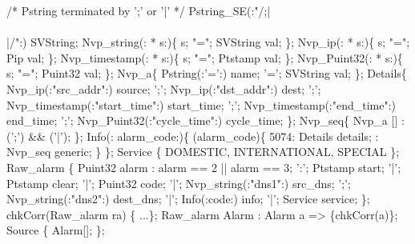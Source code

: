% 
\begin{code}
/* Pstring terminated by ';' or '|' */
 Pstring\_SE(:"/;|\\\\|/":) SVString;
\mbox{}
 Nvp\_string(: * s:)\{
  s; "="; SVString val;
\};
\mbox{}
 Nvp\_ip(: * s:)\{
  s; "="; Pip val;
\};
\mbox{}
 Nvp\_timestamp(: * s:)\{
  s; "="; Ptstamp val;
\};
\mbox{}
 Nvp\_Puint32(: * s:)\{
  s; "="; Puint32 val;
\};
\mbox{}
 Nvp\_a\{
      Pstring(:'=':) name;
 '='; SVString       val;
\};
\mbox{}
 Details\{
      Nvp\_ip(:"src\_addr":) source;
';';  Nvp\_ip(:"dst\_addr":) dest;
';';  Nvp\_timestamp(:"start\_time":) start\_time;
';';  Nvp\_timestamp(:"end\_time":)   end\_time;
';';  Nvp\_Puint32(:"cycle\_time":)   cycle\_time;
\};
\mbox{}
 Nvp\_seq\{
  Nvp\_a [] : (';') && ('|');
\};
\mbox{}
 Info(: alarm\_code:)\{
   (alarm\_code)\{
     5074: Details   details;
    :   Nvp\_seq   generic;
  \}
\};
\mbox{}
 Service \{
   DOMESTIC,
   INTERNATIONAL,
   SPECIAL
\};
\mbox{}
 Raw\_alarm \{
       Puint32 alarm : alarm == 2 || alarm == 3;
 ':';   Ptstamp start;
 '|';   Ptstamp clear;
 '|';  Puint32      code;
 '|';  Nvp\_string(:"dns1":) src\_dns;
 ';';  Nvp\_string(:"dns2":) dest\_dns;
 '|';  Info(:code:) info;
 '|';  Service      service;
\};
\mbox{}
 chkCorr(Raw\_alarm ra) \{ ...\};
\mbox{}
  Raw\_alarm Alarm :
         Alarm a => \{chkCorr(a)\};
\mbox{}
  Source \{
  Alarm[];
\};
\end{code}
